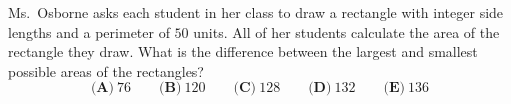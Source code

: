 Ms.\ Osborne asks each student in her class to draw a rectangle with integer side lengths and a perimeter of $50$ units. All of her students calculate the area of the rectangle they draw. What is the difference between the largest and smallest possible areas of the rectangles?
\[\textbf{(A)}\ 76\qquad\textbf{(B)}\ 120\qquad\textbf{(C)}\ 128\qquad\textbf{(D)}\ 132\qquad\textbf{(E)}\ 136\]
